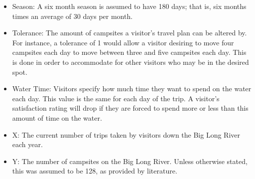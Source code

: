 \documentclass[11pt]{article} %
\begin{document}
\begin{itemize}
\item Season: A six month season is assumed to have 180 days; that is,
six months times an average of 30 days per month.

\item Tolerance: The amount of campsites a visitor's travel plan can be
altered by. For instance, a tolerance of 1 would allow a visitor desiring
to move four campsites each day to move between three and five campsites
each day. This is done in order to accommodate for other visitors who may
be in the desired spot.

\item Water Time: Visitors specify how much time they want to spend on the
water each day. This value is the same for each day of the trip. A visitor's
satisfaction rating will drop if they are forced to spend
more or less than this amount of time on the water.

\item X: The current number of trips taken by visitors down the Big Long River
each year.

\item Y: The number of campsites on the Big Long River. Unless otherwise stated,
this was assumed to be 128, as provided by literature\cite{NumCampsites}.
\end{itemize}
\end{document}
